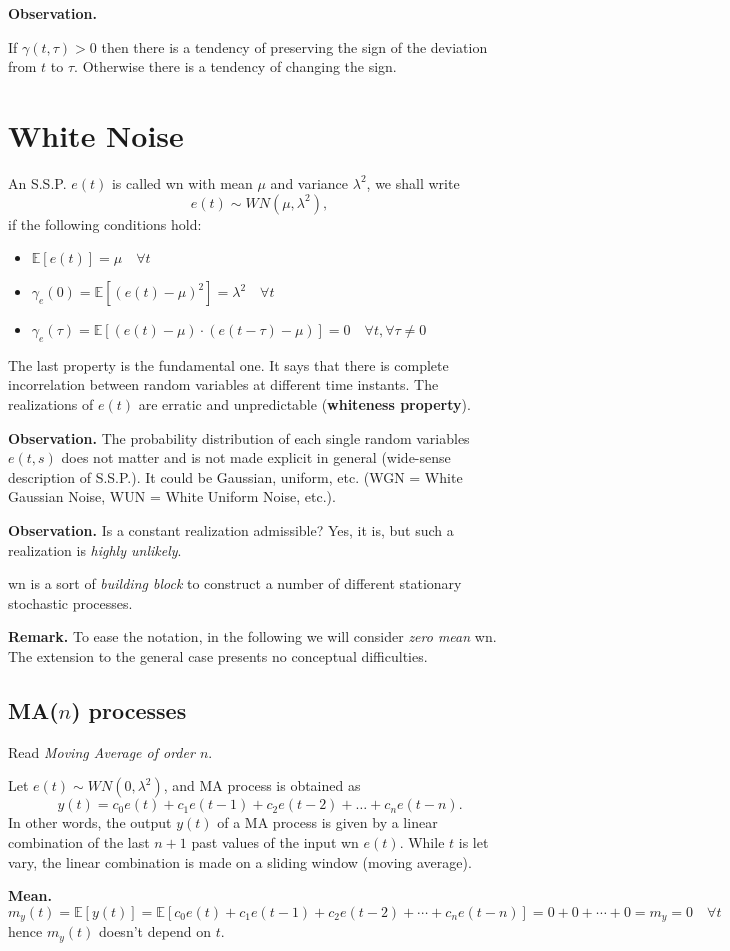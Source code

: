 \textbf{Observation.}

If $\gamma(t, \tau)>0$ then there is a tendency of preserving the sign of the deviation from $t$ to $\tau $. Otherwise there is a tendency of changing the sign.

\section{White Noise}

An S.S.P. $e(t)$ is called \gls{wn} with mean $\mu$ and variance $\lambda^{2}$, we shall write
\[
	e(t) \sim W N(\mu, \lambda^{2}),
\]
if the following conditions hold:
\begin{itemize}
	\item $\mathbb{E}[e(t)]=\mu \quad \forall t$
	\item $\gamma_{e}(0)=\mathbb{E}[(e(t)-\mu)^{2}]=\lambda^{2} \quad \forall t$
	\item $\gamma_{e}(\tau)=\mathbb{E}[(e(t)-\mu) \cdot(e(t-\tau)-\mu)]=0 \quad \forall t, \forall \tau \neq 0$
\end{itemize}

The last property is the fundamental one. It says that there is complete incorrelation between random variables at different time instants. The realizations of $e(t)$ are erratic and unpredictable (\textbf{whiteness property}).


\textbf{Observation.} The probability distribution of each single random variables $e(t,s)$ does not matter and is not made explicit in general (wide-sense description of S.S.P.).
It could be Gaussian, uniform, etc. (WGN = White Gaussian Noise, WUN = White Uniform Noise, etc.).

\textbf{Observation.} Is a constant realization admissible? Yes, it is, but such a realization is \emph{highly unlikely}.

\gls{wn} is a sort of \emph{building block} to construct a number of different stationary stochastic processes.

\textbf{Remark.} To ease the notation, in the following we will consider \emph{zero mean} \gls{wn}. The extension to the general case presents no conceptual difficulties.

\subsection{MA(\texorpdfstring{$n$}{n}) processes}

Read \emph{Moving Average of order $n$}.

Let $e(t) \sim W N(0, \lambda^{2})$, and MA process is obtained as
\[
	\boxed{y(t)=c_{0} e(t)+c_{1} e(t-1)+c_{2} e(t-2)+\ldots+c_{n} e(t-n).}
\]
In other words, the output $y(t)$ of a MA process is given by a linear combination of the last $n+1$ past values of the input \gls{wn} $e(t)$.
While $t$ is let vary, the linear combination is made on a sliding window (moving average).

\textbf{Mean.}
\[
	m_{y}(t)=\mathbb{E}[y(t)] = \mathbb{E}[c_{0} e(t)+c_{1} e(t-1)+c_{2} e(t-2)+\cdots+c_{n} e(t-n)] = 0+0+\cdots+0=m_{y}=0 \quad \forall t
\]
hence $m_{y}(t)$ doesn't depend on $t$.